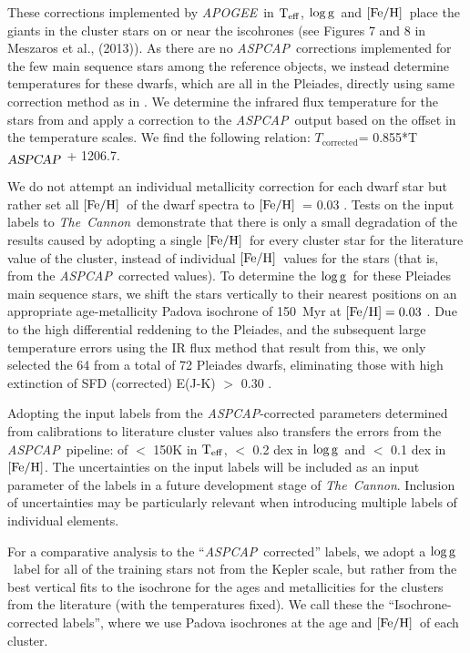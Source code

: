 \documentclass[12pt, preprint]{aastex}
\newcommand{\teff}{\mbox{$\rm T_{eff}$}}
\newcommand{\feh}{\mbox{$\rm [Fe/H]$}}
\newcommand{\logg}{\mbox{$\rm \log g$}}
\newcommand{\tc}{\textsl{The~Cannon}}
\newcommand{\apogee}{\textsl{APOGEE}}
\newcommand{\aspcap}{\textsl{ASPCAP}}
\begin{document}
These corrections implemented by \apogee\ in \teff, \logg\ and  \feh\ place the giants in the cluster stars on or near the iscohrones (see Figures 7 and 8 in Meszaros et al., (2013)).  
As there are no \aspcap\ corrections implemented for the few main sequence stars among the reference objects, 
we instead determine temperatures for these dwarfs, which are all in the Pleiades, directly using same correction method 
as in \citet{Meszaros2013}. 
We determine the infrared flux temperature for the stars from \citet{gonzalez2009} and apply a correction to 
the \aspcap\ output based on the offset in the temperature scales. We find the following relation:
 $T_{\mbox{corrected}}$= 0.855*T$_{\mbox{\textit{\aspcap}}}$ + 1206.7.


We do not attempt an individual metallicity correction for each dwarf star but rather set all \feh\ of the dwarf spectra to \feh\ = 0.03 \citep{barrado2001}.
Tests on the input labels to \tc\ demonstrate that there is only a small degradation of the results caused by adopting a single \feh\ for every cluster star for the literature value of the cluster, instead of individual \feh\ values for the stars (that is, from the \aspcap\ corrected values). 
To determine the \logg\ for these Pleiades main sequence stars, we shift the stars vertically to their nearest positions on an appropriate age-metallicity Padova isochrone of 150~Myr at $\feh = 0.03$ \citep{girardi2000}. 
Due to the high differential reddening to the Pleiades, and the subsequent large temperature errors using the IR flux method that result from this, we only selected the 64 from a total of 72 Pleiades dwarfs, eliminating those with high extinction of SFD (corrected) E(J-K) $>$ 0.30 \citep{Schlafly2011}.

Adopting the input labels from the \aspcap-corrected parameters determined from calibrations to literature cluster values also transfers the errors from the \aspcap\ pipeline: of $<$ 150K in \teff,  $<$ 0.2 dex in \logg\ and $<$ 0.1 dex in \feh.   
The uncertainties on the input labels will be included as an input parameter of the labels in a future development stage of \tc. Inclusion of uncertainties may be particularly relevant when introducing multiple labels of individual elements. 

For a comparative analysis to the ``\aspcap\ corrected'' labels, we adopt a \logg\ label for all of the training stars not from the Kepler scale, but rather from the best vertical fits to the isochrone for the ages and metallicities for the clusters from the literature (with the temperatures fixed). 
We call these the ``Isochrone-corrected labels'', where we use Padova isochrones at the age and \feh\ of each cluster. 
\end{document}
